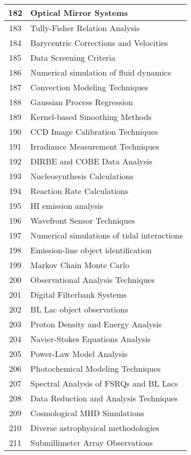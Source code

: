 \begin{table}[htbp]
\begin{tabular}{|c|l|}
\hline
182 & Optical Mirror Systems \\
\hline
183 & Tully-Fisher Relation Analysis \\
\hline
184 & Barycentric Corrections and Velocities \\
\hline
185 & Data Screening Criteria \\
\hline
186 & Numerical simulation of fluid dynamics \\
\hline
187 & Convection Modeling Techniques \\
\hline
188 & Gaussian Process Regression \\
\hline
189 & Kernel-based Smoothing Methods \\
\hline
190 & CCD Image Calibration Techniques \\
\hline
191 & Irradiance Measurement Techniques \\
\hline
192 & DIRBE and COBE Data Analysis \\
\hline
193 & Nucleosynthesis Calculations \\
\hline
194 & Reaction Rate Calculations \\
\hline
195 & HI emission analysis \\
\hline
196 & Wavefront Sensor Techniques \\
\hline
197 & Numerical simulations of tidal interactions \\
\hline
198 & Emission-line object identification \\
\hline
199 & Markov Chain Monte Carlo \\
\hline
200 & Observational Analysis Techniques \\
\hline
201 & Digital Filterbank Systems \\
\hline
202 & BL Lac object observations \\
\hline
203 & Proton Density and Energy Analysis \\
\hline
204 & Navier-Stokes Equations Analysis \\
\hline
205 & Power-Law Model Analysis \\
\hline
206 & Photochemical Modeling Techniques \\
\hline
207 & Spectral Analysis of FSRQs and BL Lacs \\
\hline
208 & Data Reduction and Analysis Techniques \\
\hline
209 & Cosmological MHD Simulations \\
\hline
210 & Diverse astrophysical methodologies \\
\hline
211 & Submillimeter Array Observations \\

\end{tabular}
\end{table}
